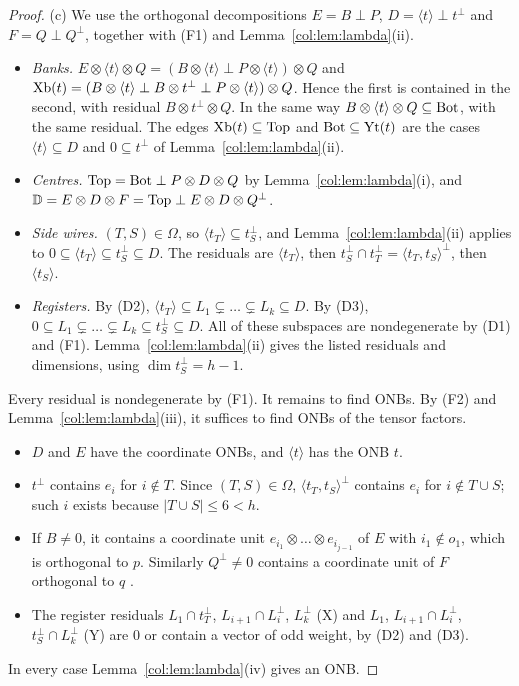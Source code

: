 \begin{proof}
(c) We use the orthogonal decompositions $E=B\perp P$, $D=\langle t\rangle\perp t^\perp$ and
$F=Q\perp Q^\perp$, together with (F1) and Lemma~\ref{col:lem:lambda}(ii).
\begin{itemize}
\item \emph{Banks.} $E\otimes\langle t\rangle\otimes Q=(B\otimes\langle t\rangle\perp P\otimes\langle t\rangle)\otimes Q$ and
  $\mathrm{Xb}(t)=(B\otimes\langle t\rangle\perp B\otimes t^\perp\perp P\otimes\langle t\rangle)\otimes Q$. Hence the
  first is contained in the second, with residual $B\otimes t^\perp\otimes Q$. In the same way
  $B\otimes\langle t\rangle\otimes Q\subseteq\mathrm{Bot}$, with the same residual. The edges
  $\mathrm{Xb}(t)\subseteq\mathrm{Top}$ and $\mathrm{Bot}\subseteq\mathrm{Yt}(t)$ are the cases $\langle t\rangle\subseteq D$
  and $0\subseteq t^\perp$ of Lemma~\ref{col:lem:lambda}(ii).
\item \emph{Centres.} $\mathrm{Top}=\mathrm{Bot}\perp P\otimes D\otimes Q$ by Lemma~\ref{col:lem:lambda}(i), and
  $\mathbb{D}=E\otimes D\otimes F=\mathrm{Top}\perp E\otimes D\otimes Q^\perp$.
\item \emph{Side wires.} $(T,S)\in\Omega$, so $\langle t_T\rangle\subseteq t_S^\perp$, and
  Lemma~\ref{col:lem:lambda}(ii) applies to $0\subseteq\langle t_T\rangle\subseteq t_S^\perp\subseteq D$.
  The residuals are $\langle t_T\rangle$, then $t_S^\perp\cap t_T^\perp=\langle t_T,t_S\rangle^\perp$, then
  $\langle t_S\rangle$.
\item \emph{Registers.} By (D2), $\langle t_T\rangle\subseteq L_1\subsetneq\dots\subsetneq L_k\subseteq D$. By
  (D3), $0\subseteq L_1\subsetneq\dots\subsetneq L_k\subseteq t_S^\perp\subseteq D$. All of these subspaces are
  nondegenerate by (D1) and (F1). Lemma~\ref{col:lem:lambda}(ii) gives the listed residuals and
  dimensions, using $\dim t_S^\perp=h-1$.
\end{itemize}
Every residual is nondegenerate by (F1). It remains to find ONBs. By (F2) and
Lemma~\ref{col:lem:lambda}(iii), it suffices to find ONBs of the tensor factors.
\begin{itemize}
\item $D$ and $E$ have the coordinate ONBs, and $\langle t\rangle$ has the ONB $t$.
\item $t^\perp$ contains $e_i$ for $i\notin T$. Since $(T,S)\in\Omega$, $\langle t_T,t_S\rangle^\perp$
  contains $e_i$ for $i\notin T\cup S$; such $i$ exists because $|T\cup S|\le6<h$.
\item If $B\ne0$, it contains a coordinate unit $e_{i_1}\otimes\dots\otimes e_{i_{j-1}}$ of $E$ with
  $i_1\notin o_1$, which is orthogonal to $p$. Similarly $Q^\perp\ne0$ contains a coordinate unit of
  $F$ orthogonal to $q$ \cite[proof of Lemma~2.3]{oai}.
\item The register residuals $L_1\cap t_T^\perp$, $L_{i+1}\cap L_i^\perp$, $L_k^\perp$ (X) and $L_1$,
  $L_{i+1}\cap L_i^\perp$, $t_S^\perp\cap L_k^\perp$ (Y) are $0$ or contain a vector of odd weight, by
  (D2) and (D3).
\end{itemize}
In every case Lemma~\ref{col:lem:lambda}(iv) gives an ONB.


\end{proof}
